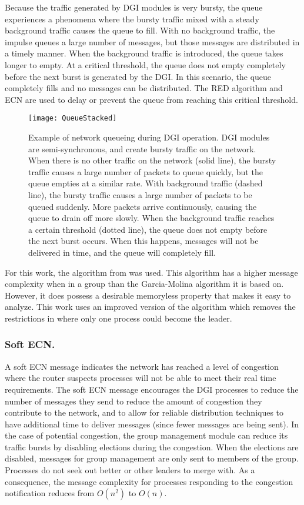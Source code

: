 Because the traffic generated by \ac{DGI} modules is very bursty, the queue experiences a phenomena where the bursty traffic mixed with a steady background traffic causes the queue to fill.
With no background traffic, the impulse queues a large number of messages, but those messages are distributed in a timely manner.
When the background traffic is introduced, the queue takes longer to empty.
At a critical threshold, the queue does not empty completely before the next burst is generated by the \ac{DGI}.
In this scenario, the queue completely fills and no messages can be distributed.
The \ac{RED} algorithm and \ac{ECN} are used to delay or prevent the queue from reaching this critical threshold.

\begin{figure}
\centering
\texttt{[image: QueueStacked]}
\caption{
Example of network queueing during \ac{DGI} operation. \ac{DGI} modules are semi-synchronous, and create bursty traffic on the network.
When there is no other traffic on the network (solid line), the bursty traffic causes a large number of packets to queue quickly, but the queue empties at a similar rate.
With background traffic (dashed line), the bursty traffic causes a large number of packets to be queued suddenly. More packets arrive continuously, causing the queue to drain off more slowly.
When the background traffic reaches a certain threshold (dotted line), the queue does not empty before the next burst occurs. When this happens, messages will not be delivered in time, and the queue will completely fill.
}
\label{fig:queue-types}
\end{figure}

For this work, the algorithm from \cite{JOURNAL} was used.
This algorithm has a higher message complexity when in a group than the Garcia-Molina algorithm it is based on.
However, it does possess a desirable memoryless property that makes it easy to analyze.
This work uses an improved version of the algorithm which removes the restrictions in \cite{JOURNAL} where only one process could become the leader.

\subsubsection{Soft \ac{ECN}.}

A soft \ac{ECN} message indicates the network has reached a level of congestion where the router suspects processes will not be able to meet their real time requirements.
The soft \ac{ECN} message encourages the \ac{DGI} processes to reduce the number of messages they send to reduce the amount of congestion they contribute to the network, and to allow for reliable distribution techniques to have additional time to deliver messages (since fewer messages are being sent).
In the case of potential congestion, the group management module can reduce its traffic bursts by disabling elections during the congestion.
When the elections are disabled, messages for group management are only sent to members of the group.
Processes do not seek out better or other leaders to merge with.
As a consequence, the message complexity for processes responding to the congestion notification reduces from $O(n^2)$ to $O(n)$.


